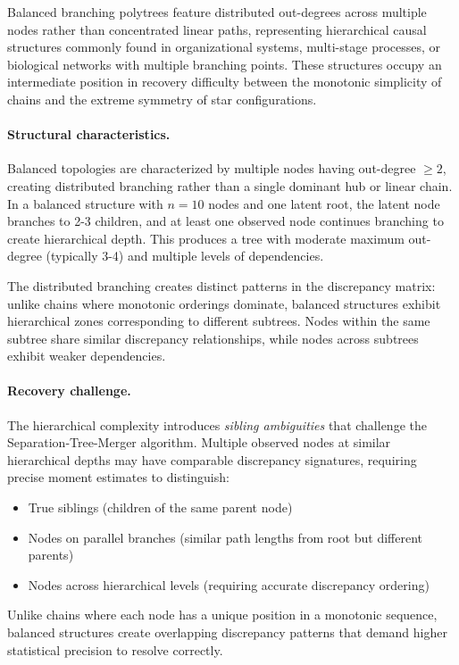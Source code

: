 \documentclass[11pt,a4paper]{article}
\numberwithin{equation}{section}
\begin{document}
Balanced branching polytrees feature distributed out-degrees across multiple nodes rather than concentrated linear paths, representing hierarchical causal structures commonly found in organizational systems, multi-stage processes, or biological networks with multiple branching points. These structures occupy an intermediate position in recovery difficulty between the monotonic simplicity of chains and the extreme symmetry of star configurations.

\paragraph{Structural characteristics.} Balanced topologies are characterized by multiple nodes having out-degree $\geq 2$, creating distributed branching rather than a single dominant hub or linear chain. In a balanced structure with $n=10$ nodes and one latent root, the latent node branches to 2-3 children, and at least one observed node continues branching to create hierarchical depth. This produces a tree with moderate maximum out-degree (typically 3-4) and multiple levels of dependencies.

The distributed branching creates distinct patterns in the discrepancy matrix: unlike chains where monotonic orderings dominate, balanced structures exhibit hierarchical zones corresponding to different subtrees. Nodes within the same subtree share similar discrepancy relationships, while nodes across subtrees exhibit weaker dependencies.

\paragraph{Recovery challenge.} The hierarchical complexity introduces \emph{sibling ambiguities} that challenge the Separation-Tree-Merger algorithm. Multiple observed nodes at similar hierarchical depths may have comparable discrepancy signatures, requiring precise moment estimates to distinguish:
\begin{itemize}
\item True siblings (children of the same parent node)
\item Nodes on parallel branches (similar path lengths from root but different parents)
\item Nodes across hierarchical levels (requiring accurate discrepancy ordering)
\end{itemize}

Unlike chains where each node has a unique position in a monotonic sequence, balanced structures create overlapping discrepancy patterns that demand higher statistical precision to resolve correctly.
\end{document}
